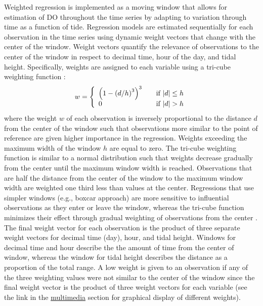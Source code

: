 \documentclass[letterpaper,12pt,oneside]{article}\usepackage[]{graphicx}\usepackage[]{color}
\begin{document}
Weighted regression is implemented as a moving window that allows for estimation of \ac{DO} throughout the time series by adapting to variation through time as a function of tide. Regression models are estimated sequentially for each observation in the time series using dynamic weight vectors that change with the center of the window.  Weight vectors quantify the relevance of observations to the center of the window in respect to decimal time, hour of the day, and tidal height.  Specifically, weights are assigned to each variable using a tri-cube weighting function \citep{Tukey77,Hirsch10}:
\begin{equation}
w= \left\{ 
  \begin{array}{l l}
    \left(1-\left(d/h\right)^3\right)^3 & \quad \textrm{if } |d| \leq h \\
    0 & \quad \textrm{if } |d| > h 
  \end{array} \right.
\end{equation}
where the weight $w$ of each observation is inversely proportional to the distance $d$ from the center of the window such that observations more similar to the point of reference are given higher importance in the regression.  Weights exceeding the maximum width of the window $h$ are equal to zero.  The tri-cube weighting function is similar to a normal distribution such that weights decrease gradually from the center until the maximum window width is reached.  Observations that are half the distance from the center of the window to the maximum window width are weighted one third less than values at the center.  Regressions that use simpler windows (e.g., boxcar approach) are  more sensitive to influential observations as they enter or leave the window, whereas the tri-cube function minimizes their effect through gradual weighting of observations from the center \citep{Hirsch10}.  The final weight vector for each observation is the product of three separate weight vectors for decimal time (day), hour, and tidal height. Windows for decimal time and hour describe the the amount of time from the center of window, whereas the window for tidal height describes the distance as a proportion of the total range.  A low weight is given to an observation if any of the three weighting values were not similar to the center of the window since the final weight vector is the product of three weight vectors for each variable (see the link in the \hyperref[multi]{multimedia} section for graphical display of different weights).    
\end{document}
